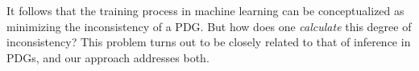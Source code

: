 \documentclass[twoside]{article}
\begin{document}
It follows that the training process in machine learning can
    be conceptualized as minimizing the inconsistency of a PDG.
        But how {does} one \emph{calculate} this degree of inconsistency?
This problem turns out to be closely related to that of
    inference in PDGs, and our approach addresses both.
\end{document}
